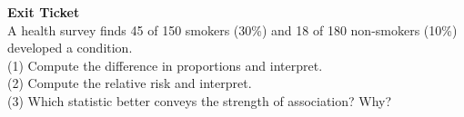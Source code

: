 \documentclass[aspectratio=169, 11pt]{beamer}
\begin{document}
{
\begin{frame}[plain]
  \vspace{3cm}\hspace{0.55cm}%
  \begin{minipage}{0.9\textwidth}
    {\color{goldacc}\bfseries\large Exit Ticket}\\[0.6cm]
    {\color{white} A health survey finds 45 of 150 smokers (30\%) and 18 of 180 non-smokers (10\%)
    developed a condition.}\\[0.5cm]
    {\color{skymid}\small
      (1) Compute the difference in proportions and interpret.\\
      (2) Compute the relative risk and interpret.\\
      (3) Which statistic better conveys the strength of association? Why?}
  \end{minipage}
\end{frame}
}
\end{document}
